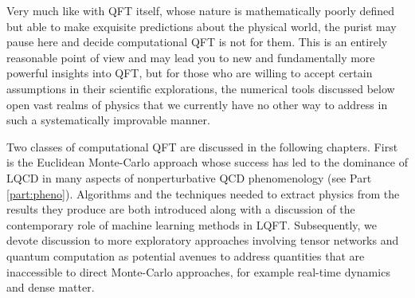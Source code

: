  Very much like with QFT itself, whose nature is mathematically poorly defined but able to make exquisite predictions about the physical world, the purist may pause here and decide computational QFT is not for them. This is an entirely reasonable point of view and may lead you to new and fundamentally more powerful insights into QFT, but for those who are willing to accept certain assumptions in their scientific explorations, the numerical tools discussed below open vast realms of physics that we currently have no other way to address in such a systematically improvable manner. 

 Two classes of computational QFT are discussed in the following chapters. First is the Euclidean Monte-Carlo approach whose success has led to the dominance of LQCD in many aspects of nonperturbative QCD phenomenology (see Part \ref{part:pheno}). Algorithms and the techniques needed to extract physics from the results they produce are both introduced along with a  discussion of the contemporary role of machine learning methods in LQFT. Subsequently, we devote discussion to more exploratory approaches involving tensor networks and quantum computation as potential avenues to address quantities that are inaccessible to direct Monte-Carlo approaches, for example real-time dynamics and dense matter.
